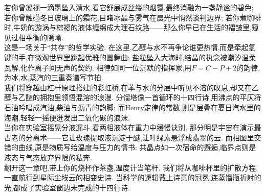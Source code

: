 \documentclass{ctexart}
\begin{document}
\pagestyle{plain}
\setcounter{footnote}{0}
\begin{center}
\end{center}\vspace{15pt}

\indent 若你曾凝视一滴墨坠入清水,看它舒展成丝缕的烟霭,最终消融为一盏静谧的碧色;%
若你曾触碰冬日玻璃上的霜花,目睹冰晶与雾气在晨光中悄然谈判边界;%
若你煮咖啡时,牛奶的漩涡与棕褐的液体缠绵成大理石纹路——那么你早已在生活的褶皱里,窥见过相平衡的隐喻.\\
\indent 这是一场关于“共存”的哲学实验.%
在这里,乙醇与水不再争论谁更热情,而是牵起氢键的手,在微观世界里跳起优雅的圆舞曲;%
盐粒坠入大海时,结晶的执念被潮汐温柔瓦解,化作离子间无声的契约.%
相律如同一位沉默的指挥家,用$F=C-P+2$的韵律,为冰,水,蒸汽的三重奏谱写节拍.\\
\indent 我们将穿越由杠杆原理搭建的彩虹桥,在苯与水的分层中听见不溶的叹息,却又在乙醇与乙醚的拥抱里领悟混溶的浪漫.%
分馏塔像一首循环的十四行诗,用沸点的平仄将石油吟唱成汽油,柴油与沥青的韵脚;%
而Henry定律的常数,则是层叠在夏日汽水里的海潮,轻轻一摇便迸发出二氧化碳的浪沫.\\
\indent 当你在实验室摇晃分液漏斗,看两相液体在重力中缓慢诀别,%
那分明是宇宙在演示最古老的分离术——它让玫瑰提取液沉淀于醚,让叶绿素悬浮成翡翠的云.%
而相图里交错的曲线,原是物质写给温度与压力的情书:%
共晶点如一次宿命的邂逅,临界点则是液态与气态放弃界限的私奔.\\
\indent 翻开这一章吧,带上你的烧杯作茶盏,温度计当笔杆.%
我们将从咖啡杯里的扩散方程,一直航行到星际尘埃云的相变史诗.%
当科学的逻辑戴上诗意的冠冕,连蒸馏瓶折射的光,都成了实验室窗边未完成的十四行诗.
\newpage
\newpage
\newpage
\newpage
\end{document}
